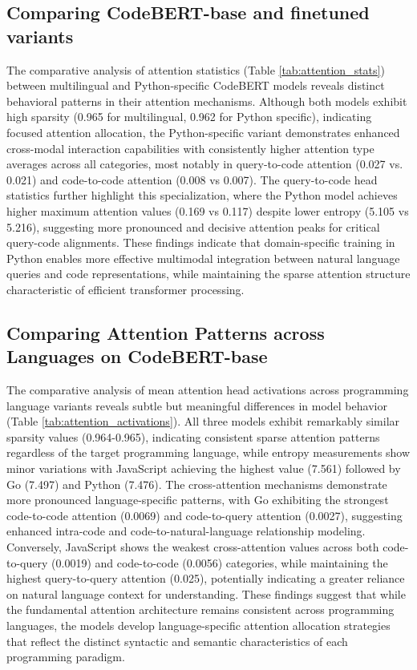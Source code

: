 \documentclass[conference]{IEEEtran}
\begin{document}
\subsection{Comparing CodeBERT-base and finetuned variants}
The comparative analysis of attention statistics (Table \ref{tab:attention_stats}) between multilingual and Python-specific CodeBERT models reveals distinct behavioral patterns in their attention mechanisms. Although both models exhibit high sparsity (0.965 for multilingual, 0.962 for Python specific), indicating focused attention allocation, the Python-specific variant demonstrates enhanced cross-modal interaction capabilities with consistently higher attention type averages across all categories, most notably in query-to-code attention (0.027 vs. 0.021) and code-to-code attention (0.008 vs 0.007). The query-to-code head statistics further highlight this specialization, where the Python model achieves higher maximum attention values (0.169 vs 0.117) despite lower entropy (5.105 vs 5.216), suggesting more pronounced and decisive attention peaks for critical query-code alignments. These findings indicate that domain-specific training in Python enables more effective multimodal integration between natural language queries and code representations, while maintaining the sparse attention structure characteristic of efficient transformer processing.

\subsection{Comparing Attention Patterns across Languages on CodeBERT-base}
The comparative analysis of mean attention head activations across programming language variants reveals subtle but meaningful differences in model behavior (Table \ref{tab:attention_activations}). All three models exhibit remarkably similar sparsity values (0.964-0.965), indicating consistent sparse attention patterns regardless of the target programming language, while entropy measurements show minor variations with JavaScript achieving the highest value (7.561) followed by Go (7.497) and Python (7.476). The cross-attention mechanisms demonstrate more pronounced language-specific patterns, with Go exhibiting the strongest code-to-code attention (0.0069) and code-to-query attention (0.0027), suggesting enhanced intra-code and code-to-natural-language relationship modeling. Conversely, JavaScript shows the weakest cross-attention values across both code-to-query (0.0019) and code-to-code (0.0056) categories, while maintaining the highest query-to-query attention (0.025), potentially indicating a greater reliance on natural language context for understanding. These findings suggest that while the fundamental attention architecture remains consistent across programming languages, the models develop language-specific attention allocation strategies that reflect the distinct syntactic and semantic characteristics of each programming paradigm.
\end{document}
